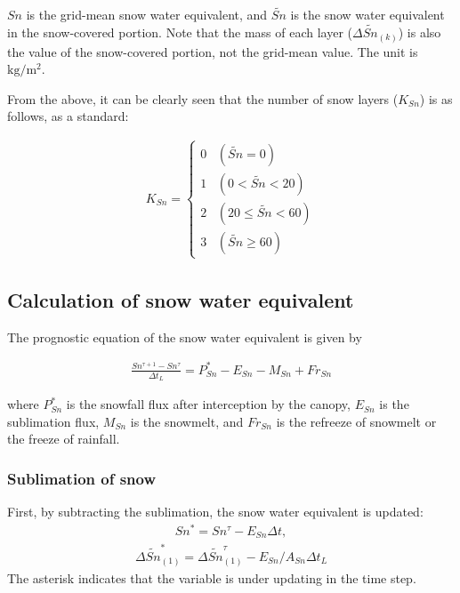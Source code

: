 \(Sn\) is the grid-mean snow water equivalent, and \(\widetilde{Sn}\) is the snow water equivalent in the snow-covered portion. Note that the mass of each layer (\(\Delta{\widetilde{Sn}}_{(k)}\)) is
also the value of the snow-covered portion, not the grid-mean value. The unit is \(\mathrm{kg/m^2}\).

From the above, it can be clearly seen that the number of snow layers (\(K_{Sn}\)) is as follows, as a standard:

\begin{eqnarray}
 K_{Sn} = \left\{
\begin{array}{ll}
 0 \;\;\; (\widetilde{Sn} = 0)\\
 1 \;\;\; (0< \widetilde{Sn} < 20)\\
 2 \;\;\; (20 \leq \widetilde{Sn} < 60)\\
 3 \;\;\; (\widetilde{Sn} \geq 60)
\end{array}
\right. \label{8-8}
\end{eqnarray}

\subsection{Calculation of snow water equivalent}\label{calculation-of-snow-water-equivalent}

The prognostic equation of the snow water equivalent is given by

\begin{eqnarray}
 \frac{Sn^{\tau+1}-Sn^{\tau}}{\Delta t_L} = P_{Sn}^{\ast} - E_{Sn} - M_{Sn} + Fr_{Sn} \label{8-12}
\end{eqnarray}

where \(P_{Sn}^{\ast}\) is the snowfall flux after interception by the canopy, \(E_{Sn}\) is the sublimation flux, \(M_{Sn}\) is the snowmelt, and \(Fr_{Sn}\) is the refreeze of snowmelt or the freeze
of rainfall.

\subsubsection{Sublimation of snow}\label{sublimation-of-snow}

First, by subtracting the sublimation, the snow water equivalent is updated: \begin{eqnarray}
Sn^{\ast} = Sn^{\tau} - E_{Sn} \Delta t, \label{8-10}
\end{eqnarray} \begin{eqnarray}
\Delta \widetilde{Sn}_{(1)}^{\ast} = \Delta \widetilde{Sn}_{(1)}^{\tau} - E_{Sn}/A_{Sn} \Delta t_L \label{8-14}
\end{eqnarray} The asterisk indicates that the variable is under updating in the time step.

